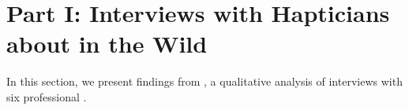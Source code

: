 \section{Part I: Interviews with Hapticians about \haxd{} in the Wild}
\label{sec:interviews}
\noindent
In this section, we present findings from , a qualitative analysis of interviews with six professional .




